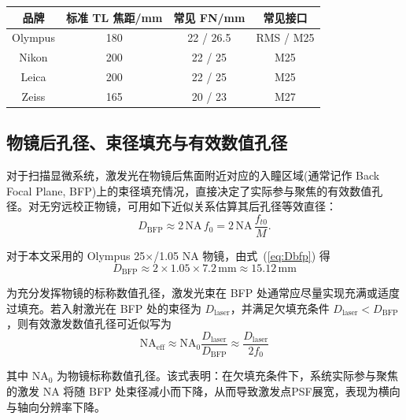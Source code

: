 \begin{table}[htbp]
\centering
{}
\label{tab:objective_brand_compare}
\setlength{\tabcolsep}{4pt}
\begin{tabular}{|c|c|c|c|}
\hline
品牌 & 标准 TL 焦距/mm & 常见 FN/mm & 常见接口 \\ \hline
Olympus & 180 & 22 / 26.5 & RMS / M25 \\ \hline
Nikon   & 200 & 22 / 25   & M25 \\ \hline
Leica   & 200 & 22 / 25   & M25 \\ \hline
Zeiss   & 165 & 20 / 23   & M27 \\ \hline
\end{tabular}
\end{table}




\subsection{物镜后孔径、束径填充与有效数值孔径}\label{2.4.2}

对于扫描显微系统，激发光在物镜后焦面附近对应的入瞳区域(通常记作 Back Focal Plane, BFP)上的束径填充情况，直接决定了实际参与聚焦的有效数值孔径。对无穷远校正物镜，可用如下近似关系估算其后孔径等效直径：
\begin{equation}
  D_{\mathrm{BFP}}\approx 2\,\mathrm{NA}\,f_0
  =2\,\mathrm{NA}\,\frac{f_{t0}}{M}.
  \label{eq:Dbfp}
\end{equation}

对于本文采用的 Olympus 25$\times$/1.05 NA 物镜，由式~(\ref{eq:Dbfp}) 得
\begin{equation}
  D_{\mathrm{BFP}}\approx 2\times1.05\times7.2\,\mathrm{mm}\approx 15.12\,\mathrm{mm}
  \label{eq:Dbfp_olympus}
\end{equation}

为充分发挥物镜的标称数值孔径，激发光束在 BFP 处通常应尽量实现充满或适度过填充。若入射激光在 BFP 处的束径为 $D_{\mathrm{laser}}$，并满足欠填充条件 $D_{\mathrm{laser}}<D_{\mathrm{BFP}}$，则有效激发数值孔径可近似写为
\begin{equation}
  \mathrm{NA}_{\mathrm{eff}}\approx \mathrm{NA}_{0}\frac{D_{\mathrm{laser}}}{D_{\mathrm{BFP}}}
  \approx \frac{D_{\mathrm{laser}}}{2f_0}
  \label{eq:NAeff}
\end{equation}

其中 $\mathrm{NA}_{0}$ 为物镜标称数值孔径。该式表明：在欠填充条件下，系统实际参与聚焦的激发 NA 将随 BFP 处束径减小而下降，从而导致激发点PSF展宽，表现为横向与轴向分辨率下降。

